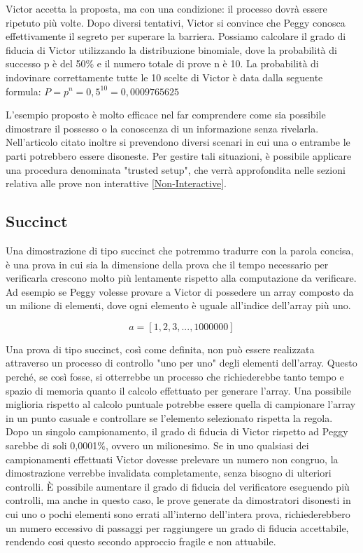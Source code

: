 Victor accetta la proposta, ma con una condizione: il processo dovrà essere
ripetuto più volte. Dopo diversi tentativi, Victor si convince che Peggy conosca effettivamente il segreto per superare
la barriera. Possiamo calcolare il grado di fiducia di Victor utilizzando la distribuzione binomiale, dove la probabilità di
successo p è del 50\% e il numero totale di prove n è 10. La probabilità di indovinare correttamente tutte le 10 scelte
di Victor è data dalla seguente formula: \(P = p^n = 0,5^{10} = 0,0009765625\)

L'esempio proposto è molto efficace nel far comprendere come sia possibile dimostrare il possesso o la conoscenza di un
informazione senza rivelarla. Nell’articolo citato inoltre si prevendono diversi scenari in cui una o entrambe le parti
potrebbero essere disoneste. Per gestire tali situazioni, è possibile applicare una procedura denominata "trusted
setup", che verrà approfondita nelle sezioni relativa alle prove non interattive \hyperref[sec:non-interactive]{[Non-Interactive]}.

\subsection{Succinct}
Una dimostrazione di tipo succinct che potremmo tradurre con la parola concisa, è una prova in cui sia la dimensione
della prova che il tempo necessario per verificarla crescono molto più lentamente rispetto alla computazione da
verificare. Ad esempio se Peggy volesse provare a Victor di possedere un array composto da un milione di elementi, dove
ogni elemento è uguale all’indice dell’array più uno.

\begin{equation}
a = [1,2,3,...,1000000]
\end{equation}

Una prova di tipo succinct, così come definita, non può essere realizzata attraverso un processo di controllo "uno per
uno" degli elementi dell'array. Questo perché, se così fosse, si otterrebbe un processo che richiederebbe tanto tempo e
spazio di memoria quanto il calcolo effettuato per generare l'array. Una possibile miglioria rispetto al calcolo puntuale
potrebbe essere quella di campionare l'array in un punto casuale e controllare se l'elemento selezionato rispetta la
regola. \\
Dopo un singolo campionamento, il grado di fiducia di Victor rispetto ad Peggy sarebbe di soli 0,0001\%, ovvero un
milionesimo. Se in uno qualsiasi dei campionamenti effettuati Victor dovesse prelevare un numero non congruo, la
dimostrazione verrebbe invalidata completamente, senza bisogno di ulteriori controlli. È possibile aumentare il grado di
fiducia del verificatore eseguendo più controlli, ma anche in questo caso, le prove generate da dimostratori disonesti
in cui uno o pochi elementi sono errati all'interno dell'intera prova, richiederebbero un numero eccessivo di passaggi
per raggiungere un grado di fiducia accettabile, rendendo cosi questo secondo approccio fragile e non attuabile.

